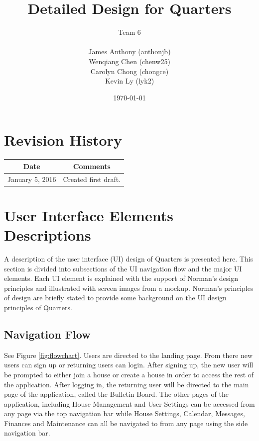 \documentclass[12pt]{article}
\begin{document}
\title{Detailed Design for Quarters}
\author{Team 6\\ \\James Anthony (anthonjb)\\ Wenqiang Chen (chenw25)\\ Carolyn Chong
(chongce)\\ Kevin Ly (lyk2)}
\date{\today}

\maketitle

\pagebreak

\tableofcontents
\listoffigures

\section*{Revision History}
\begin{tabular}{|c|c|}
\hline
\textbf{Date}  & \textbf{Comments} \\ \hline
January 5, 2016 & Created first draft. \\
\hline
\end{tabular}

\pagebreak


\section{User Interface Elements Descriptions}

A description of the user interface (UI) design of Quarters is presented here. This section is divided into subsections of the UI navigation flow and the major UI elements. Each UI element is explained with the support of Norman's design principles and illustrated with screen images from a mockup. Norman's principles of design are briefly stated to provide some background on the UI design principles of Quarters.

\subsection{Navigation Flow}
See Figure \ref{fig:flowchart}. Users are directed to the landing page. From there new users can sign up or returning users can login. After signing up, the new user will be prompted to either join a house or create a house in order to access the rest of the application. After logging in, the returning user will be directed to the main page of the application, called the Bulletin Board. The other pages of the application, including House Management and User Settings can be accessed from any page via the top navigation bar while House Settings, Calendar, Messages, Finances and Maintenance can all be navigated to from any page using the side navigation bar.\\
\end{document}
